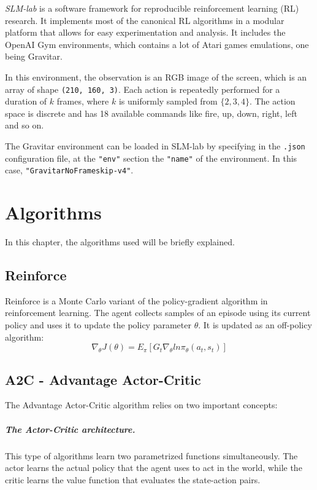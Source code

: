 \documentclass[12pt,a4paper]{report}
\begin{document}
		\emph{SLM-lab} \cite{kenggraesser2017slmlab} is a software framework for reproducible reinforcement learning (RL) research. It implements most of the canonical RL algorithms in a modular platform that allows for easy experimentation and analysis. It includes the OpenAI Gym \cite{brockman2016openai} environments, which contains a lot of Atari games emulations, one being Gravitar.
		
		In this environment, the observation is an RGB image of the screen, which is an array of shape \lstinline|(210, 160, 3)|. Each action is repeatedly performed for a duration of $k$ frames, where $k$ is uniformly sampled from $\{2, 3, 4\}$. The action space is discrete and has 18 available commands like fire, up, down, right, left and so on.
		
		The Gravitar environment can be loaded in SLM-lab by specifying in the \lstinline|.json| configuration file, at the \lstinline|"env"| section the \lstinline|"name"| of the environment. In this case, \lstinline|"GravitarNoFrameskip-v4"|. 
		
	\chapter{Algorithms}
		In this chapter, the algorithms used will be briefly explained.
		\section{Reinforce}
		Reinforce is a Monte Carlo variant of the policy-gradient algorithm in reinforcement learning. The agent collects samples of an episode using its current policy and uses it to update the policy parameter $\theta$. It is updated as an off-policy algorithm:
		\begin{equation}
			\nabla_\theta J(\theta) = E_\pi[G_t \nabla_\theta ln \pi_\theta(a_t, s_t)]
		\end{equation}  
		\section{A2C - Advantage Actor-Critic}
		The Advantage Actor-Critic algorithm relies on two important concepts:
			\paragraph{The Actor-Critic architecture.} This type of algorithms learn two parametrized functions simultaneously. The actor learns the actual policy that the agent uses to act in the world, while the critic learns the value function that evaluates the state-action pairs.
			
\end{document}
